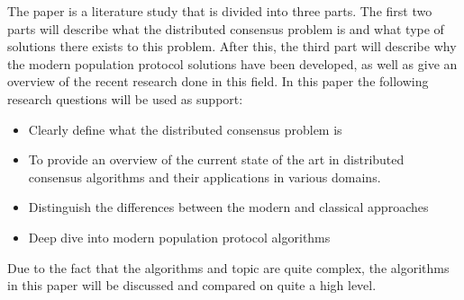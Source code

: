 The paper is a literature study that is divided into three parts. The first two parts will describe what the distributed consensus problem is and what type of solutions there exists to this problem. After this, the third part will describe why the modern population protocol solutions have been developed, as well as give an overview of the recent research done in this field. In this paper the following research questions will be used as support:

\begin{itemize}
    \item Clearly define what the distributed consensus problem is
    \item To provide an overview of the current state of the art in distributed consensus algorithms and their applications in various domains.
    \item Distinguish the differences between the modern and classical approaches
    \item Deep dive into modern population protocol algorithms
\end{itemize}

Due to the fact that the algorithms and topic are quite complex, the algorithms in this paper will be discussed and compared on quite a high level.

\subsection{}

\clearpage
